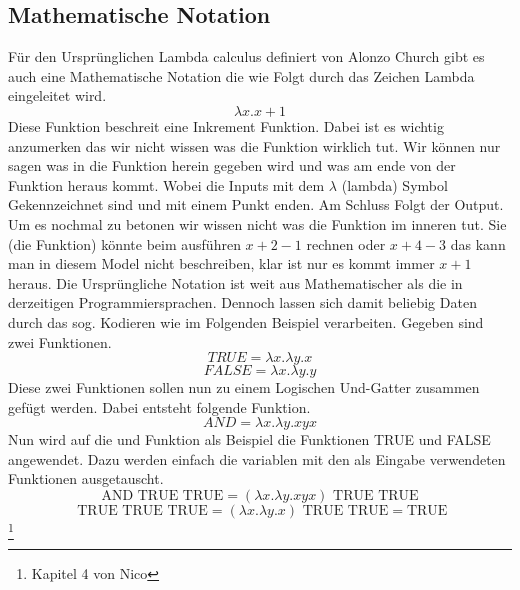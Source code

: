 \subsection{Mathematische Notation}
Für den Ursprünglichen Lambda calculus definiert von Alonzo Church gibt es auch 
eine Mathematische Notation die wie Folgt durch das Zeichen Lambda eingeleitet wird.
\begin{equation}
\lambda x. x + 1
\end{equation}
Diese Funktion beschreit eine Inkrement Funktion. Dabei ist es wichtig anzumerken das wir nicht wissen was die Funktion wirklich tut. Wir können nur sagen was in die Funktion herein gegeben wird und was am ende von der Funktion heraus kommt. Wobei die Inputs mit dem $\lambda$ (lambda) Symbol Gekennzeichnet sind und mit einem Punkt enden. Am Schluss Folgt der Output. Um es nochmal zu betonen wir wissen nicht was die Funktion im inneren tut. Sie (die Funktion) könnte beim ausführen $x + 2 - 1$ rechnen oder $x + 4 - 3$ das kann man in diesem Model nicht beschreiben, klar ist nur es kommt immer $x + 1$ heraus.
Die Ursprüngliche Notation ist weit aus Mathematischer als die in derzeitigen Programmiersprachen. Dennoch lassen sich damit beliebig Daten durch das sog. Kodieren wie im Folgenden Beispiel verarbeiten.
Gegeben sind zwei Funktionen.
\begin{equation}
TRUE = \lambda x. \lambda y. x
\end{equation}
\begin{equation}
FALSE = \lambda x. \lambda y. y
\end{equation}
Diese zwei Funktionen sollen nun zu einem Logischen Und-Gatter zusammen gefügt werden.
Dabei entsteht folgende Funktion.
\begin{equation}
AND = \lambda x. \lambda y. x y x
\end{equation}
Nun wird auf die und Funktion als Beispiel die Funktionen TRUE und FALSE angewendet. Dazu werden einfach die variablen mit den als Eingabe verwendeten Funktionen ausgetauscht.
\begin{equation}
\text{AND TRUE TRUE} = (\lambda x. \lambda y. x y x) \text{ TRUE TRUE} 
\end{equation}
\begin{equation}
\text{ TRUE TRUE TRUE} = (\lambda x. \lambda y. x) \text{ TRUE TRUE} = \text{TRUE}
\end{equation}
\footnote{Kapitel 4 von Nico}\cite{lambdacalculus} 